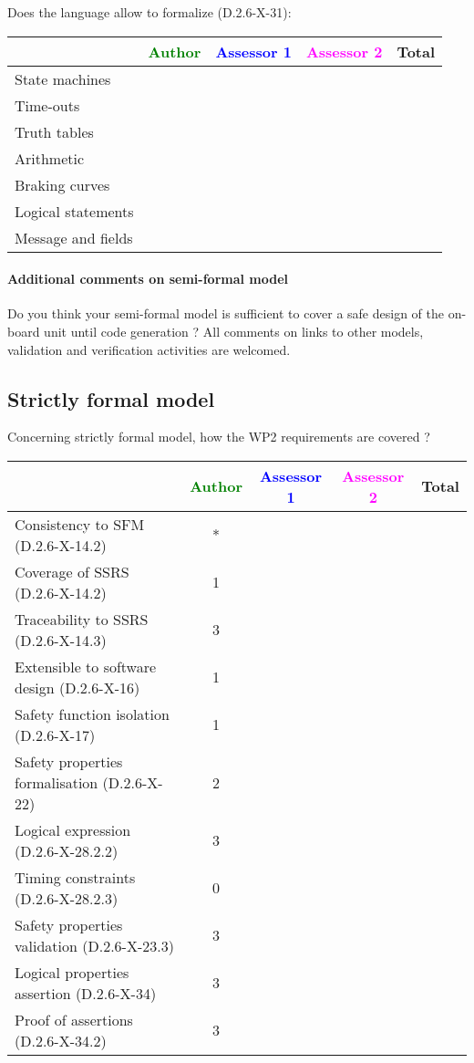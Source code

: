 Does the language allow to  formalize (D.2.6-X-31):

\begin{tabular}{|l | c | c | c | c|}
\hline
& \textcolor{green}{Author} & \textcolor{blue}{Assessor 1} & \textcolor{magenta}{Assessor 2} & Total \\
\hline 
State machines  & & & &  \\
\hline
Time-outs  & & & &  \\
\hline
Truth tables  & & & &  \\
\hline
Arithmetic  & & & &  \\
\hline
Braking curves  & & & &  \\
\hline
Logical statements & & & &  \\
\hline
Message and fields & & & &  \\
\hline
\end{tabular}

\paragraph{Additional comments on semi-formal  model} Do you think your semi-formal  model is sufficient to cover a safe design of the on-board unit until code generation ?
All comments on links to  other models, validation and verification activities are welcomed.

\subsection{Strictly formal model}

Concerning strictly formal model, how the WP2 requirements are covered ?

\begin{tabular}{|l | c | c | c | c|}
\hline
& \textcolor{green}{Author} & \textcolor{blue}{Assessor 1} & \textcolor{magenta}{Assessor 2} & Total \\
\hline 
Consistency to SFM (D.2.6-X-14.2) &* & & &  \\
\hline
Coverage of SSRS (D.2.6-X-14.2)  &1 & & &  \\
\hline
Traceability to  SSRS (D.2.6-X-14.3)  &3 & & &  \\
\hline
Extensible to software design (D.2.6-X-16)  &1 & & &  \\
\hline
Safety function isolation (D.2.6-X-17)  &1 & & &  \\
\hline 
Safety properties formalisation (D.2.6-X-22)  &2 & & &  \\
\hline
Logical expression (D.2.6-X-28.2.2)  &3 & & &  \\
\hline
Timing constraints (D.2.6-X-28.2.3)  &0 & & &  \\
\hline
Safety properties validation (D.2.6-X-23.3)  &3 & & &  \\
\hline
Logical properties assertion (D.2.6-X-34)  &3 & & &  \\
\hline
Proof of assertions (D.2.6-X-34.2)  &3 & & &  \\
\hline
\end{tabular}

